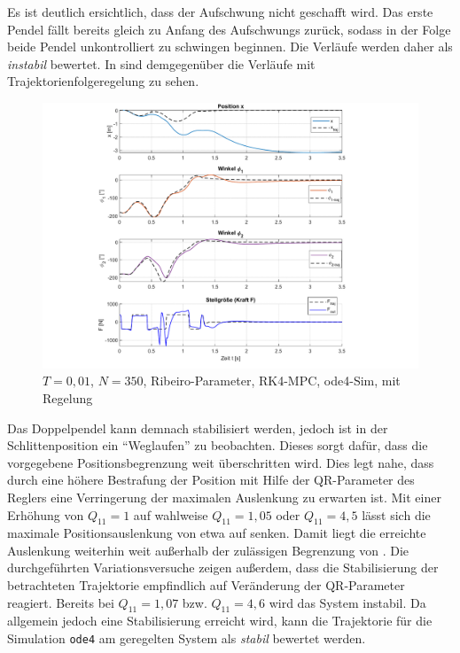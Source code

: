 Es ist deutlich ersichtlich, dass der Aufschwung nicht geschafft wird. Das erste Pendel fällt bereits gleich zu Anfang des Aufschwungs zurück, sodass in der Folge beide Pendel unkontrolliert zu schwingen beginnen. Die Verläufe werden daher als \textit{instabil} bewertet.
In  sind demgegenüber die Verläufe mit Trajektorienfolgeregelung zu sehen. 

\begin{figure}
	\centering
		\includegraphics[scale=\scaleyplots]{Bilder/Trajektorien/F400T0.01_rib_rk4_ode4_TFR_QR-alt.pdf}
	\caption{$T=0,01$, $N=350$, Ribeiro-Parameter, RK4-MPC, ode4-Sim, mit Regelung}
	\label{fig:F400T0.01_rib_rk4_ode4_TFR_QR-alt}
\end{figure}

Das Doppelpendel kann demnach stabilisiert werden, jedoch ist in der Schlittenposition ein "`Weglaufen"' zu beobachten. Dieses sorgt dafür, dass die vorgegebene Positionsbegrenzung weit überschritten wird. Dies legt nahe, dass durch eine höhere Bestrafung der Position mit Hilfe der QR-Parameter des Reglers eine Verringerung der maximalen Auslenkung zu erwarten ist. Mit einer Erhöhung von $Q_{11}=1$ auf wahlweise $Q_{11}=1,05$ oder $Q_{11}=4,5$ lässt sich die maximale Positionsauslenkung von etwa  auf  senken. Damit liegt die erreichte Auslenkung weiterhin weit außerhalb der zulässigen Begrenzung von . Die durchgeführten Variationsversuche zeigen außerdem, dass die Stabilisierung der betrachteten Trajektorie empfindlich auf Veränderung der QR-Parameter reagiert. Bereits bei $Q_{11}=1,07$ bzw. $Q_{11}=4,6$ wird das System instabil. Da allgemein jedoch eine Stabilisierung erreicht wird, kann die Trajektorie für die Simulation \texttt{ode4} am geregelten System als \textit{stabil} bewertet werden. 


